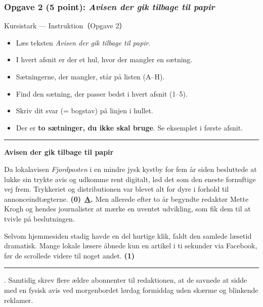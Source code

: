 \subsubsection*{Opgave 2 (5 point): \textit{Avisen der gik tilbage til papir}}

\begin{emailbox}{Kursistark --- Instruktion（Opgave 2）}
\begin{itemize}
  \item Læs teksten \textit{Avisen der gik tilbage til papir}.
  \item I hvert afsnit er der et hul, hvor der mangler en sætning.
  \item Sætningerne, der mangler, står på listen (A--H).
  \item Find den sætning, der passer bedst i hvert afsnit (1--5).
  \item Skriv dit svar (= bogstav) på linjen i hullet.
  \item Der er \textbf{to sætninger, du ikke skal bruge}. Se eksemplet i første afsnit.
\end{itemize}

\vspace{0.35em}
\hrule
\vspace{0.45em}

\textbf{\color{NCDNavy}Avisen der gik tilbage til papir}

\vspace{0.3em}
Da lokalavisen \textit{Fjordposten} i en mindre jysk kystby for fem år siden besluttede at lukke sin trykte avis og udkomme rent digitalt, lød det som den eneste fornuftige vej frem. Trykkeriet og distributionen var blevet alt for dyre i forhold til annonceindtægterne. \textbf{(0)}\ \underline{\hspace{0.45cm}\textbf{A}\hspace{0.45cm}}\textbf{.} Men allerede efter to år begyndte redaktør Mette Krogh og hendes journalister at mærke en uventet udvikling, som fik dem til at tvivle på beslutningen.

\vspace{0.25em}
Selvom hjemmesiden stadig havde en del hurtige klik, faldt den samlede læsetid dramatisk. Mange lokale læsere åbnede kun en artikel i ti sekunder via Facebook, før de scrollede videre til noget andet. \textbf{(1)}\ \rule{1.8cm}{0.4pt}. Samtidig skrev flere ældre abonnenter til redaktionen, at de savnede at sidde med en fysisk avis ved morgenbordet lørdag formiddag uden skærme og blinkende reklamer.


\end{emailbox}
